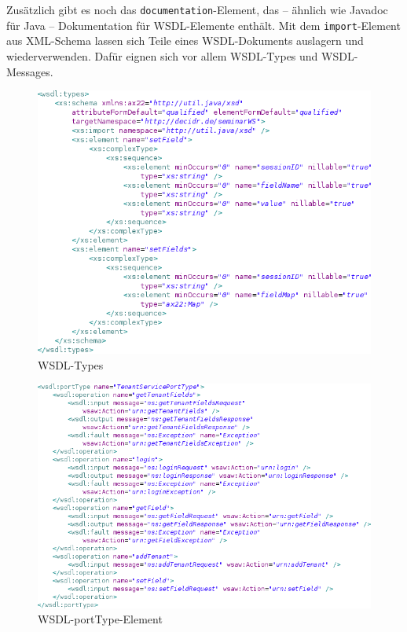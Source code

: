 \documentclass[runningheads]{llncs}
\begin{document}
    Zusätzlich gibt es noch das \texttt{documentation}-Element, das -- ähnlich wie Javadoc für Java
    -- Dokumentation für WSDL-Elemente enthält. Mit dem \texttt{import}-Element aus XML-Schema
    lassen sich Teile eines WSDL-Dokuments auslagern und wiederverwenden. Dafür eignen sich vor
    allem WSDL-Types und WSDL-Messages.

    \begin{figure}[ht!]
      \centering
      \includegraphics[width=\textwidth]{../images/wsdl_types.png}
      \caption{WSDL-Types}
      \label{fig:wsdl_types}
    \end{figure}

    \begin{figure}[ht!]
      \centering
      \includegraphics[width=\textwidth]{../images/wsdl_portType.png}
      \caption{WSDL-portType-Element}
      \label{fig:wsdl_portType}
    \end{figure}
\end{document}
